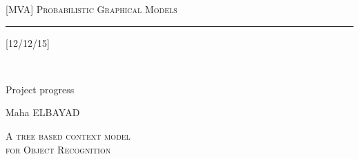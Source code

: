 \documentclass[11pt]{article}
\begin{document}
{\scshape{\LARGE[MVA] Probabilistic Graphical Models}\rule{4.4cm}{.4pt}[12/12/15]}\\
\begin{minipage}[t]{6cm}
\flushleft
Project progress
\end{minipage}
\null\hfill
\begin{minipage}[r]{6cm}
\flushright
  Maha ELBAYAD
\end{minipage}
\begin{center}
\scshape{\LARGE A tree based context model \\for Object Recognition}\\
\end{center}
\vspace{10pt}
\end{document}
